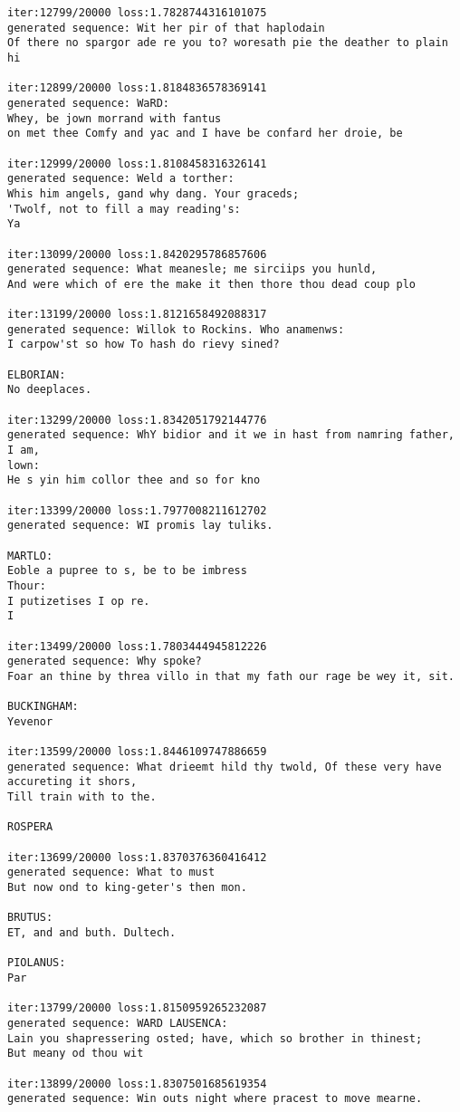 \documentclass[11pt]{article}
\begin{document}
\begin{Verbatim}[commandchars=\\\{\}]
iter:12799/20000 loss:1.7828744316101075
generated sequence: Wit her pir of that haplodain
Of there no spargor ade re you to? woresath pie the deather to plain hi

iter:12899/20000 loss:1.8184836578369141
generated sequence: WaRD:
Whey, be jown morrand with fantus
on met thee Comfy and yac and I have be confard her droie, be

iter:12999/20000 loss:1.8108458316326141
generated sequence: Weld a torther:
Whis him angels, gand why dang. Your graceds;
'Twolf, not to fill a may reading's:
Ya

iter:13099/20000 loss:1.8420295786857606
generated sequence: What meanesle; me sirciips you hunld,
And were which of ere the make it then thore thou dead coup plo

iter:13199/20000 loss:1.8121658492088317
generated sequence: Willok to Rockins. Who anamenws:
I carpow'st so how To hash do rievy sined?

ELBORIAN:
No deeplaces. 

iter:13299/20000 loss:1.8342051792144776
generated sequence: WhY bidior and it we in hast from namring father, I am,
lown:
He s yin him collor thee and so for kno

iter:13399/20000 loss:1.7977008211612702
generated sequence: WI promis lay tuliks.

MARTLO:
Eoble a pupree to s, be to be imbress
Thour:
I putizetises I op re.
I 

iter:13499/20000 loss:1.7803444945812226
generated sequence: Why spoke?
Foar an thine by threa villo in that my fath our rage be wey it, sit.

BUCKINGHAM:
Yevenor

iter:13599/20000 loss:1.8446109747886659
generated sequence: What drieemt hild thy twold, Of these very have accureting it shors,
Till train with to the.

ROSPERA

iter:13699/20000 loss:1.8370376360416412
generated sequence: What to must
But now ond to king-geter's then mon.

BRUTUS:
ET, and and buth. Dultech.

PIOLANUS:
Par

iter:13799/20000 loss:1.8150959265232087
generated sequence: WARD LAUSENCA:
Lain you shapressering osted; have, which so brother in thinest;
But meany od thou wit

iter:13899/20000 loss:1.8307501685619354
generated sequence: Win outs night where pracest to move mearne.


\end{Verbatim}
\end{document}
